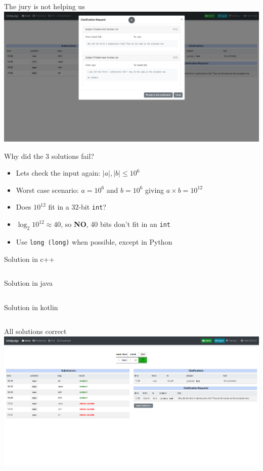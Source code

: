 \documentclass[11pt,pdf, aspectratio=169]{beamer}
\begin{document}
  \begin{frame}{The jury is not helping us}
    \includegraphics[width=\linewidth]{images/session-1/domjudge-clar-4}
  \end{frame}
  \begin{frame}{Why did the 3 solutions fail?}
    \begin{itemize}
      \item <1-> Lets check the input again: $|a|,|b| \leq 10^6$
      \item <2-> Worst case scenario: $a=10^6$ and $b=10^6$ giving  $a \times b = 10^{12}$
      \item <3-> Does $10^{12}$ fit in a 32-bit \texttt{int}?
      \item <4-> $\log_2 10^{12} \approx 40$, so \textbf{NO}, 40 bits don't fit in an \texttt{int}
      \item <5-> Use \texttt{long (long)} when possible, except in Python
    \end{itemize}
  \end{frame}
  \begin{frame}[containsverbatim]{Solution in c++}
    \inputminted{c++}{code/session-1/c++/example.cpp}
  \end{frame}
  \begin{frame}[containsverbatim]{Solution in java}
    \inputminted{java}{code/session-1/java/example.java}
  \end{frame}
  \begin{frame}[containsverbatim]{Solution in kotlin}
    \inputminted{kotlin}{code/session-1/kotlin/example.kt}
  \end{frame}
  \begin{frame}{All solutions correct}
    \includegraphics[width=\linewidth]{images/session-1/domjudge-all-correct}
  \end{frame}
\end{document}

